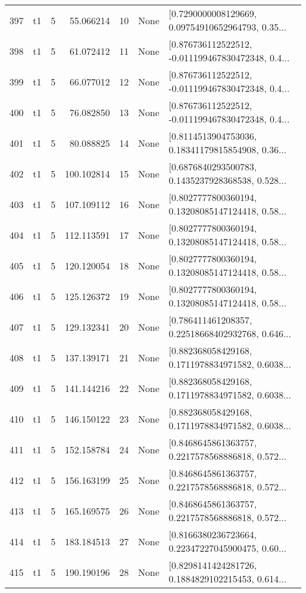 \begin{tabular}{lllrlll}
397 &  t1 &   5 &   55.066214 &   10 &  None &  [0.7290000008129669, 0.09754910652964793, 0.35... \\
398 &  t1 &   5 &   61.072412 &   11 &  None &  [0.876736112522512, -0.011199467830472348, 0.4... \\
399 &  t1 &   5 &   66.077012 &   12 &  None &  [0.876736112522512, -0.011199467830472348, 0.4... \\
400 &  t1 &   5 &   76.082850 &   13 &  None &  [0.876736112522512, -0.011199467830472348, 0.4... \\
401 &  t1 &   5 &   80.088825 &   14 &  None &  [0.8114513904753036, 0.18341179815854908, 0.36... \\
402 &  t1 &   5 &  100.102814 &   15 &  None &  [0.6876840293500783, 0.1435237928368538, 0.528... \\
403 &  t1 &   5 &  107.109112 &   16 &  None &  [0.8027777800360194, 0.13208085147124418, 0.58... \\
404 &  t1 &   5 &  112.113591 &   17 &  None &  [0.8027777800360194, 0.13208085147124418, 0.58... \\
405 &  t1 &   5 &  120.120054 &   18 &  None &  [0.8027777800360194, 0.13208085147124418, 0.58... \\
406 &  t1 &   5 &  125.126372 &   19 &  None &  [0.8027777800360194, 0.13208085147124418, 0.58... \\
407 &  t1 &   5 &  129.132341 &   20 &  None &  [0.786411461208357, 0.22518668402932768, 0.646... \\
408 &  t1 &   5 &  137.139171 &   21 &  None &  [0.882368058429168, 0.1711978834971582, 0.6038... \\
409 &  t1 &   5 &  141.144216 &   22 &  None &  [0.882368058429168, 0.1711978834971582, 0.6038... \\
410 &  t1 &   5 &  146.150122 &   23 &  None &  [0.882368058429168, 0.1711978834971582, 0.6038... \\
411 &  t1 &   5 &  152.158784 &   24 &  None &  [0.8468645861363757, 0.2217578568886818, 0.572... \\
412 &  t1 &   5 &  156.163199 &   25 &  None &  [0.8468645861363757, 0.2217578568886818, 0.572... \\
413 &  t1 &   5 &  165.169575 &   26 &  None &  [0.8468645861363757, 0.2217578568886818, 0.572... \\
414 &  t1 &   5 &  183.184513 &   27 &  None &  [0.8166380236723664, 0.22347227045900475, 0.60... \\
415 &  t1 &   5 &  190.190196 &   28 &  None &  [0.8298141424281726, 0.1884829102215453, 0.614... \\

\end{tabular}
